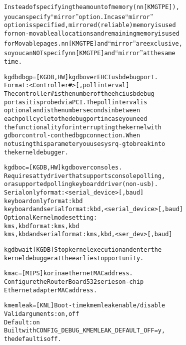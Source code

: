 \documentclass[a4paper,8pt,english]{sphinxmanual}
\begin{document}
\begin{alltt}
                        Instead of specifying the amount of memory (nn{[}KMGTPE{]}),
                        you can specify ``mirror'' option. In case ``mirror''
                        option is specified, mirrored (reliable) memory is used
                        for non-movable allocations and remaining memory is used
                        for Movable pages. nn{[}KMGTPE{]} and ``mirror'' are exclusive,
                        so you can NOT specify nn{[}KMGTPE{]} and ``mirror'' at the same
                        time.

        kgdbdbgp=       {[}KGDB,HW{]} kgdb over EHCI usb debug port.
                        Format: \textless{}Controller\#\textgreater{}{[},poll interval{]}
                        The controller \# is the number of the ehci usb debug
                        port as it is probed via PCI.  The poll interval is
                        optional and is the number seconds in between
                        each poll cycle to the debug port in case you need
                        the functionality for interrupting the kernel with
                        gdb or control-c on the dbgp connection.  When
                        not using this parameter you use sysrq-g to break into
                        the kernel debugger.

        kgdboc=         {[}KGDB,HW{]} kgdb over consoles.
                        Requires a tty driver that supports console polling,
                        or a supported polling keyboard driver (non-usb).
                         Serial only format: \textless{}serial\_device\textgreater{}{[},baud{]}
                         keyboard only format: kbd
                         keyboard and serial format: kbd,\textless{}serial\_device\textgreater{}{[},baud{]}
                        Optional Kernel mode setting:
                         kms, kbd format: kms,kbd
                         kms, kbd and serial format: kms,kbd,\textless{}ser\_dev\textgreater{}{[},baud{]}

        kgdbwait        {[}KGDB{]} Stop kernel execution and enter the
                        kernel debugger at the earliest opportunity.

        kmac=           {[}MIPS{]} korina ethernet MAC address.
                        Configure the RouterBoard 532 series on-chip
                        Ethernet adapter MAC address.

        kmemleak=       {[}KNL{]} Boot-time kmemleak enable/disable
                        Valid arguments: on, off
                        Default: on
                        Built with CONFIG\_DEBUG\_KMEMLEAK\_DEFAULT\_OFF=y,
                        the default is off.


\end{alltt}
\end{document}
